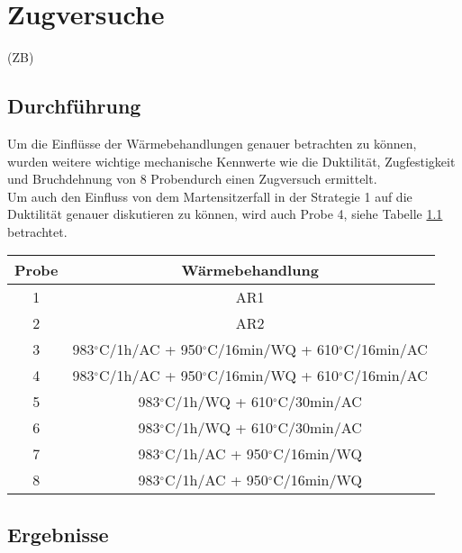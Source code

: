 \chapter{Zugversuche }

(ZB)

\section{Durchführung}

Um die Einflüsse der Wärmebehandlungen genauer betrachten zu können, wurden weitere wichtige mechanische Kennwerte wie die Duktilität, Zugfestigkeit und Bruchdehnung von 8 Probendurch einen Zugversuch ermittelt. \\
Um auch den Einfluss von dem Martensitzerfall in der Strategie 1 auf die Duktilität genauer diskutieren zu können, wird auch Probe 4, siehe Tabelle \ref{tab:ubersicht} betrachtet.


\begin{table}[h]
	\centering
	\begin{tabular}{|c|c|}
		\hline 
		Probe & Wärmebehandlung \\ 
		\hline 
		1 & AR1 \\ 
		\hline 
		2 & AR2 \\ 
		\hline 
		3 &  983$^\circ$C/1h/AC + 950$^\circ$C/16min/WQ + 610$^\circ$C/16min/AC \\ 
		\hline 
		4 &  983$^\circ$C/1h/AC + 950$^\circ$C/16min/WQ + 610$^\circ$C/16min/AC \\ 
		\hline 
		5 &  983$^\circ$C/1h/WQ + 610$^\circ$C/30min/AC \\ 
		\hline 
		6 &  983$^\circ$C/1h/WQ + 610$^\circ$C/30min/AC \\ 
		\hline 
		7 &  983$^\circ$C/1h/AC + 950$^\circ$C/16min/WQ \\ 
		\hline 
		8 &  983$^\circ$C/1h/AC + 950$^\circ$C/16min/WQ \\ 
		\hline 
	\end{tabular}
	\label{tab:ubersicht} 
\end{table}

\section{Ergebnisse}

